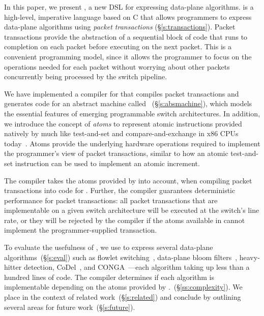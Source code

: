 In this paper, we present \pktlanguage, a new DSL for expressing data-plane
algorithms. \pktlanguage is a high-level, imperative language based on C that
allows programmers to express data-plane algorithms using {\em packet
transactions} (\S\ref{s:transactions}). Packet transactions provide the
abstraction of a sequential block of code that runs to completion on each
packet before executing on the next packet. This is a convenient programming
model, since it allows the programmer to focus on the operations needed for
each packet without worrying about other packets concurrently being processed
by the switch pipeline.

We have implemented a compiler for \pktlanguage that compiles \pktlanguage
packet transactions and generates code for an abstract machine called
\absmachine~(\S\ref{s:absmachine}), which models the essential features of
emerging programmable switch architectures.  In addition, we introduce the
concept of {\em atoms} to represent atomic instructions provided natively by
\absmachine much like test-and-set and compare-and-exchange in x86 CPUs
today~\cite{x86_manual}.  Atoms provide the underlying hardware operations
required to implement the programmer's view of packet transactions, similar to
how an atomic test-and-set instruction can be used to implement an atomic
increment.

The \pktlanguage compiler takes the atoms provided by \absmachine into account,
when compiling packet transactions into code for \absmachine. Further, the
\pktlanguage compiler guarantees deterministic performance for packet
transactions: all packet transactions that are implementable on a given switch
architecture will be executed at the switch's line rate, or they will be
rejected by the compiler if the atoms available in \absmachine cannot implement
the programmer-supplied transaction.

To evaluate the usefulness of \pktlanguage, we use \pktlanguage to express
several data-plane algorithms~(\S\ref{s:eval}) such as flowlet
switching~\cite{flowlets}, data-plane bloom filters~\cite{bloom}, heavy-hitter
detection, CoDel~\cite{codel}, and CONGA~\cite{conga}---each algorithm
taking up less than a hundred lines of \pktlanguage code.  The \pktlanguage
compiler determines if each algorithm is implementable depending on the atoms
provided by \absmachine.~(\S\ref{ss:complexity}). We place \pktlanguage in the
context of related work~(\S\ref{s:related}) and conclude by outlining several
areas for future work~(\S\ref{s:future}).
